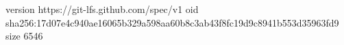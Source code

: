 version https://git-lfs.github.com/spec/v1
oid sha256:17d07e4c940ae16065b329a598aa60b8c3ab43f8fc19d9c8941b553d35963fd9
size 6546

